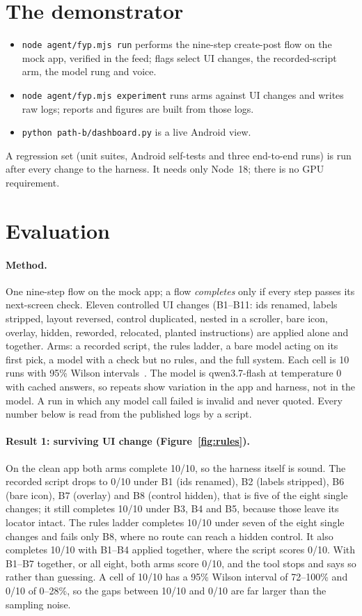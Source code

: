 \documentclass[11pt,a4paper]{article}
\begin{document}
\section{The demonstrator}
\begin{itemize}
\item \texttt{node agent/fyp.mjs run} performs the nine-step create-post flow on the mock app, verified in the feed; flags select UI changes, the recorded-script arm, the model rung and voice.
\item \texttt{node agent/fyp.mjs experiment} runs arms against UI changes and writes raw logs; reports and figures are built from those logs.
\item \texttt{python path-b/dashboard.py} is a live Android view.
\end{itemize}
A regression set (unit suites, Android self-tests and three end-to-end runs) is run after every change to the harness. It needs only Node~18; there is no GPU requirement.

\section{Evaluation}
\paragraph{Method.} One nine-step flow on the mock app; a flow \emph{completes} only if every step passes its next-screen check. Eleven controlled UI changes (B1--B11: ids renamed, labels stripped, layout reversed, control duplicated, nested in a scroller, bare icon, overlay, hidden, reworded, relocated, planted instructions) are applied alone and together. Arms: a recorded script, the rules ladder, a bare model acting on its first pick, a model with a check but no rules, and the full system. Each cell is 10 runs with 95\% Wilson intervals~\cite{wilson1927}. The model is qwen3.7-flash at temperature 0 with cached answers, so repeats show variation in the app and harness, not in the model. A run in which any model call failed is invalid and never quoted. Every number below is read from the published logs by a script.

\FigRules
\paragraph{Result 1: surviving UI change (Figure~\ref{fig:rules}).} On the clean app both arms complete 10/10, so the harness itself is sound. The recorded script drops to 0/10 under B1 (ids renamed), B2 (labels stripped), B6 (bare icon), B7 (overlay) and B8 (control hidden), that is five of the eight single changes; it still completes 10/10 under B3, B4 and B5, because those leave its locator intact. The rules ladder completes 10/10 under seven of the eight single changes and fails only B8, where no route can reach a hidden control. It also completes 10/10 with B1--B4 applied together, where the script scores 0/10. With B1--B7 together, or all eight, both arms score 0/10, and the tool stops and says so rather than guessing. A cell of 10/10 has a 95\% Wilson interval of 72--100\% and 0/10 of 0--28\%, so the gaps between 10/10 and 0/10 are far larger than the sampling noise.
\end{document}
